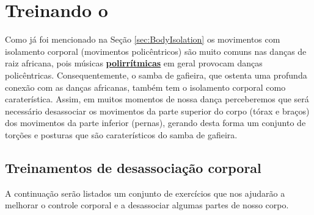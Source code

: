 

\chapter{Treinando o \bodyisolation}
\label{chap:trainingbodyisolation}

Como já foi mencionado na Seção \ref{sec:BodyIsolation} os movimentos 
com isolamento corporal (movimentos policêntricos) são muito comuns
nas danças de raiz africana, pois músicas \hyperref[subsec:polirritmia]{\textbf{polirrítmicas}}
em geral provocam danças policêntricas. 
Consequentemente, o samba de gafieira,
que ostenta uma profunda conexão com as danças africanas,
também tem o isolamento corporal como caraterística. Assim,
em muitos momentos de nossa dança perceberemos que será necessário 
desassociar os movimentos da parte superior do corpo (tórax e braços)
dos movimentos da parte inferior (pernas),
gerando desta forma um conjunto de torções e posturas que são caraterísticos do samba de gafieira. 
\section{Treinamentos de desassociação corporal}

A continuação serão listados um conjunto de exercícios que nos ajudarão a melhorar 
o controle corporal e a desassociar algumas partes de nosso corpo.

